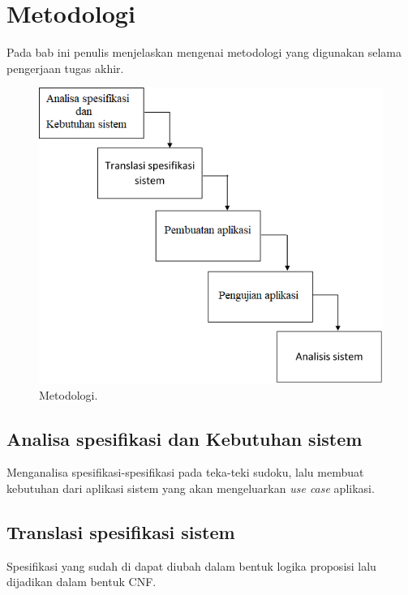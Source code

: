 \chapter{Metodologi}

Pada bab ini penulis menjelaskan mengenai metodologi yang digunakan selama pengerjaan tugas akhir.

\begin{figure}[H]
	\begin{centering}
		\includegraphics[scale=0.7]{metodologi_proposal}
		
		\caption{Metodologi.}
	\end{centering}
\end{figure}

\section{Analisa spesifikasi dan Kebutuhan sistem}

Menganalisa spesifikasi-spesifikasi pada teka-teki sudoku, lalu membuat kebutuhan dari aplikasi sistem yang akan mengeluarkan \textit{use case} aplikasi.

\section{Translasi spesifikasi sistem}

Spesifikasi yang sudah di dapat diubah dalam bentuk logika proposisi lalu dijadikan dalam bentuk CNF.

